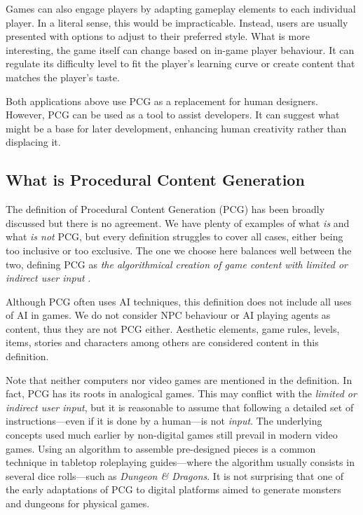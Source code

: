 
Games can also engage players by adapting gameplay elements to each individual player. In a literal sense, this would be impracticable. Instead, users are usually presented with options to adjust to their preferred style. What is more interesting, the game itself can change based on in-game player behaviour. It can regulate its difficulty level to fit the player's learning curve or create content that matches the player's taste.


Both applications above use PCG as a replacement for human designers. However, PCG can be used as a tool to assist developers. It can suggest what might be a base for later development, enhancing human creativity rather than displacing it. 


\subsection{What is Procedural Content Generation}
The definition of Procedural Content Generation (PCG) has been broadly discussed but there is no agreement. We have plenty of examples of what \textit{is} and what \textit{is not} PCG, but every definition struggles to cover all cases, either being too inclusive or too exclusive. The one we choose here balances well between the two, defining PCG as \textit{the algorithmical creation of game content with limited or indirect user input} \cite{togelius2011procedural}.


Although PCG often uses AI techniques, this definition does not include all uses of AI in games. We do not consider NPC behaviour or AI playing agents as content, thus they are not PCG either. Aesthetic elements, game rules, levels, items, stories and characters among others are considered content in this definition.


Note that neither computers nor video games are mentioned in the definition. In fact, PCG has its roots in analogical games. This may conflict with the \textit{limited or indirect user input}, but it is reasonable to assume that following a detailed set of instructions---even if it is done by a human---is not \textit{input}. The underlying concepts used much earlier by non-digital games still prevail in modern video games. Using an algorithm to assemble pre-designed pieces is a common technique in tabletop roleplaying guides---where the algorithm usually consists in several dice rolls---such as \textit{Dungeon \& Dragons}. It is not surprising that one of the early adaptations of PCG to digital platforms aimed to generate monsters and dungeons for physical games.\cite{smith2015analog}

